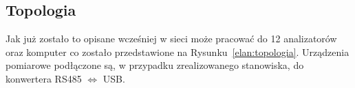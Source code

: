 \subsection{Topologia}
Jak już zostało to opisane wcześniej w sieci może pracować do 12 analizatorów oraz komputer co zostało przedstawione na Rysunku~\ref{elan:topologia}. Urządzenia pomiarowe podłączone są, w przypadku zrealizowanego stanowiska, do konwertera RS485 $\Leftrightarrow$ USB.
